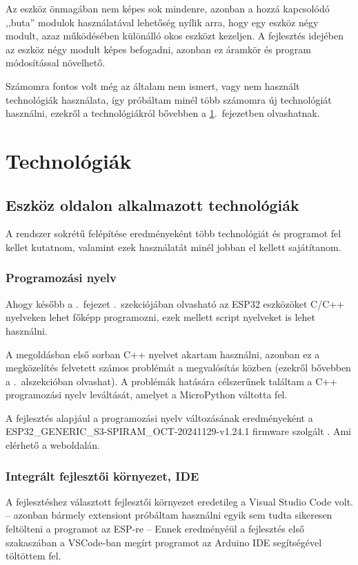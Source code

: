 \documentclass{thesis-ekf}
\theoremstyle{definition}
\theoremstyle{remark}
\begin{document}
	Az eszköz önmagában nem képes sok mindenre, azonban a hozzá kapcsolódó ,,buta'' modulok használatával lehetőség nyílik arra, hogy egy eszköz négy modult, azaz működésében különálló okos eszközt kezeljen.
	A fejlesztés idejében az eszköz négy modult képes befogadni, azonban ez áramkör és program módosítással növelhető.
	
	Számomra fontos volt még az általam nem ismert, vagy nem használt technológiák használata, így próbáltam minél több számomra új technológiát használni, ezekről a technológiákról bővebben a \ref{ch_tech}.~fejezetben olvashatnak.
	\chapter{Technológiák}
	\label{ch_tech}
	\section{Eszköz oldalon alkalmazott technológiák}
	A rendszer sokrétű felépítése eredményeként több technológiát és programot fel kellet kutatnom, valamint ezek használatát minél jobban el kellett sajátítanom.
	\subsection{Programozási nyelv}
	Ahogy később a .~fejezet .~szekciójában olvasható az ESP32 eszközöket C/C++ nyelveken lehet főképp programozni, ezek mellett script nyelveket is lehet használni.
	
	A megoldásban első sorban C++ nyelvet akartam használni, azonban ez a megközelítés felvetett számos problémát a megvalósítás közben (ezekről bővebben a .~alszekcióban olvashat). A problémák hatására célszerűnek találtam a C++ programozási nyelv leváltását, amelyet a MicroPython váltotta fel.
	
	A fejlesztés alapjául a programozási nyelv változásának eredményeként a  ESP32\_GENERIC\_S3-SPIRAM\_OCT-20241129-v1.24.1 firmware szolgált . Ami elérhető a \href{https://micropython.org/download/}{\color{blue}{MicroPython}} weboldalán.
	\subsection{Integrált fejlesztői környezet, IDE}
	A fejlesztéshez választott fejlesztői környezet eredetileg a Visual Studio Code volt. -- azonban bármely extensiont próbáltam használni egyik sem tudta sikeresen feltölteni a programot az ESP-re -- Ennek eredményéül a fejlesztés első szakaszában a VSCode-ban megírt programot az Arduino IDE segítségével töltöttem fel.
	
\end{document}
